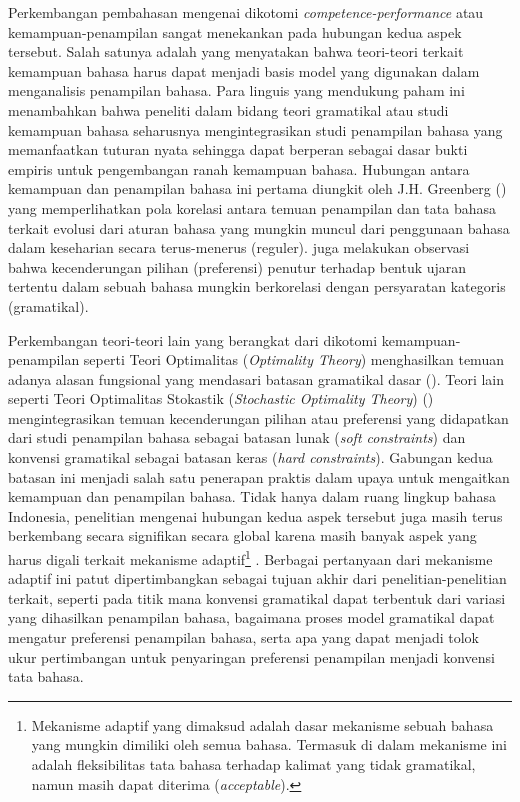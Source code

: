 Perkembangan pembahasan mengenai dikotomi \textit{competence-performance} atau kemampuan-penampilan sangat menekankan pada hubungan kedua aspek tersebut. Salah satunya adalah \cite{sagwasow2011pccg} yang menyatakan bahwa teori-teori terkait kemampuan bahasa harus dapat menjadi basis model yang digunakan dalam menganalisis penampilan bahasa. Para linguis yang mendukung paham ini menambahkan bahwa peneliti dalam bidang teori gramatikal atau studi kemampuan bahasa seharusnya mengintegrasikan studi penampilan bahasa yang memanfaatkan tuturan nyata sehingga dapat berperan sebagai dasar bukti empiris untuk pengembangan ranah kemampuan bahasa. Hubungan antara kemampuan dan penampilan bahasa ini pertama diungkit oleh J.H. Greenberg (\citealp{greenberg1963some, greenberg1966language}) yang memperlihatkan pola korelasi antara temuan penampilan dan tata bahasa terkait evolusi dari aturan bahasa yang mungkin muncul dari penggunaan bahasa dalam keseharian secara terus-menerus (reguler). \cite{givon1979syntax} juga melakukan observasi bahwa kecenderungan pilihan (preferensi) penutur terhadap bentuk ujaran tertentu dalam sebuah bahasa mungkin berkorelasi dengan persyaratan kategoris (gramatikal). 

Perkembangan teori-teori lain yang berangkat dari dikotomi kemampuan-penampilan seperti Teori Optimalitas (\textit{Optimality Theory}) menghasilkan temuan adanya alasan fungsional yang mendasari batasan gramatikal dasar (\citealp{haspelmath1999optimality, aissen1999markedness}). Teori lain seperti Teori Optimalitas Stokastik (\textit{Stochastic Optimality Theory}) (\citealp{bresnan2001soft, manning2003probabilistic}) mengintegrasikan temuan kecenderungan pilihan atau preferensi yang didapatkan dari studi penampilan bahasa sebagai batasan lunak (\textit{soft constraints}) dan konvensi gramatikal sebagai batasan keras (\textit{hard constraints}). Gabungan kedua batasan ini menjadi salah satu penerapan praktis dalam upaya untuk mengaitkan kemampuan dan penampilan bahasa. Tidak hanya dalam ruang lingkup bahasa Indonesia, penelitian mengenai hubungan kedua aspek tersebut juga masih terus berkembang secara signifikan secara global karena masih banyak aspek yang harus digali terkait mekanisme adaptif\footnote{Mekanisme adaptif yang dimaksud adalah dasar mekanisme sebuah bahasa yang mungkin dimiliki oleh semua bahasa. Termasuk di dalam mekanisme ini adalah fleksibilitas tata bahasa terhadap kalimat yang tidak gramatikal, namun masih dapat diterima (\textit{acceptable}).} \citep{kirby1999function}. Berbagai pertanyaan dari mekanisme adaptif ini patut dipertimbangkan sebagai tujuan akhir dari penelitian-penelitian terkait, seperti pada titik mana konvensi gramatikal dapat terbentuk dari variasi yang dihasilkan penampilan bahasa, bagaimana proses model gramatikal dapat mengatur preferensi penampilan bahasa, serta apa yang dapat menjadi tolok ukur pertimbangan untuk penyaringan preferensi penampilan menjadi konvensi tata bahasa.


